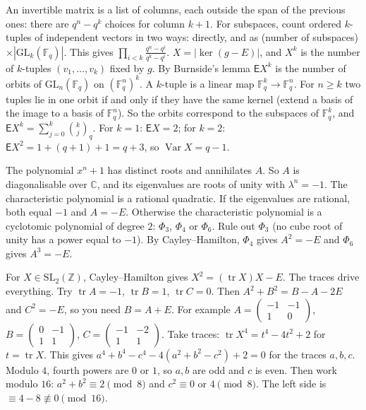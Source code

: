 \documentclass[11pt,a4paper]{article}
\begin{document}

An invertible matrix is a list of columns, each outside the span of the previous ones: there are \(q^n-q^k\) choices for column \(k+1\). For subspaces, count ordered \(k\)-tuples of independent vectors in two ways: directly, and as (number of subspaces)\(\times|\mathrm{GL}_k(\mathbb F_q)|\). This gives \(\prod_{i<k}\frac{q^n-q^i}{q^k-q^i}\).
\(X=|\ker(g-E)|\), and \(X^k\) is the number of \(k\)-tuples \((v_1,\dots,v_k)\) fixed by \(g\). By Burnside's lemma \(\mathsf EX^k\) is the number of orbits of \(\mathrm{GL}_n(\mathbb F_q)\) on \((\mathbb F_q^n)^k\).
A \(k\)-tuple is a linear map \(\mathbb F_q^k\to\mathbb F_q^n\). For \(n\ge k\) two tuples lie in one orbit if and only if they have the same kernel (extend a basis of the image to a basis of \(\mathbb F_q^n\)). So the orbits correspond to the subspaces of \(\mathbb F_q^k\), and \(\mathsf EX^k=\sum_{j=0}^k\binom kj_q\). For \(k=1\): \(\mathsf EX=2\); for \(k=2\): \(\mathsf EX^2=1+(q+1)+1=q+3\), so \(\operatorname{Var}X=q-1\).

The polynomial \(x^n+1\) has distinct roots and annihilates \(A\). So \(A\) is diagonalisable over \(\mathbb C\), and its eigenvalues are roots of unity with \(\lambda^n=-1\). The characteristic polynomial is a rational quadratic.
If the eigenvalues are rational, both equal \(-1\) and \(A=-E\). Otherwise the characteristic polynomial is a cyclotomic polynomial of degree \(2\): \(\Phi_3\), \(\Phi_4\) or \(\Phi_6\). Rule out \(\Phi_3\) (no cube root of unity has a power equal to \(-1\)). By Cayley--Hamilton, \(\Phi_4\) gives \(A^2=-E\) and \(\Phi_6\) gives \(A^3=-E\).

For \(X\in\mathrm{SL}_2(\mathbb Z)\), Cayley--Hamilton gives \(X^2=(\operatorname{tr}X)X-E\). The traces drive everything.
Try \(\operatorname{tr}A=-1\), \(\operatorname{tr}B=1\), \(\operatorname{tr}C=0\). Then \(A^2+B^2=B-A-2E\) and \(C^2=-E\), so you need \(B=A+E\). For example \(A=\begin{pmatrix}-1&-1\\1&0\end{pmatrix}\), \(B=\begin{pmatrix}0&-1\\1&1\end{pmatrix}\), \(C=\begin{pmatrix}-1&-2\\1&1\end{pmatrix}\).
Take traces: \(\operatorname{tr}X^4=t^4-4t^2+2\) for \(t=\operatorname{tr}X\). This gives \(a^4+b^4-c^4-4(a^2+b^2-c^2)+2=0\) for the traces \(a,b,c\).
Modulo \(4\), fourth powers are \(0\) or \(1\), so \(a,b\) are odd and \(c\) is even. Then work modulo \(16\): \(a^2+b^2\equiv2\pmod 8\) and \(c^2\equiv0\) or \(4\pmod 8\). The left side is \(\equiv4-8\not\equiv0\pmod{16}\).
\end{document}
